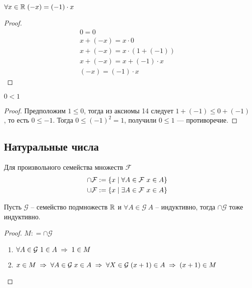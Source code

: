     \begin{theorem}
        $\forall x \in \mathbb{R} \; (-x) = (-1) \cdot x$
    \end{theorem} \begin{proof}
        \begin{gather*}
            0 = 0 \\
        x + (-x) = x \cdot 0 \\
        x + (-x) = x \cdot (1 + (-1)) \\
        x + (-x) = x + (-1) \cdot x \\
        (-x) = (-1) \cdot x
        \end{gather*}
    \end{proof}
    \begin{theorem}
        $ 0 < 1 $
    \end{theorem} \begin{proof}
        Предположим $ 1 \leq 0 $, тогда из аксиомы 14 следует $ 1 + (-1) \leq 0 + (-1) $, то есть $ 0 \leq - 1 $.
        Тогда $ 0 \leq ( - 1)^2 = 1 $, получили $ 0 \leq  1 $ --- противоречие.
    \end{proof}



\subsection{Натуральные числа}

Для произвольного семейства множеств $\mathcal{F}$
\begin{gather}
    \cap \mathcal{F} : = \{x \;\vert\; \forall A \in \mathcal{F}\ x \in A\} \\
    \cup \mathcal{F} : = \{x \;\vert\; \exists A \in \mathcal{F}\ x \in A\}
\end{gather}


 \begin{theorem}
     \label{definition_inductive}
    Пусть $ \mathcal{G} $ -- семейство подмножеств $ \mathbb{R} $ и $ \forall A \in \mathcal{G} \ A $ -- индуктивно, тогда
    $ \cap \mathcal{G} $ тоже индуктивно.
 \end{theorem}
 \begin{proof} $ M : = \cap \mathcal{G}$
    \begin{enumerate}
        \item $ \forall A \in  \mathcal{G} \ 1 \in A \thus 1 \in M $
        \item $x \in M \thus \forall A \in \mathcal{G} \; x \in A \thus \forall X \in \mathcal{G} \; (x + 1) \in A \thus (x + 1) \in M$
    \end{enumerate}
 \end{proof}


